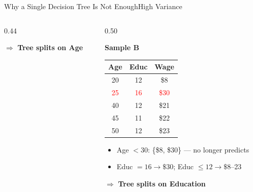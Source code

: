 \documentclass[dvipsnames,hyperref={pdfpagelabels=false}]{beamer}
\begin{document}
\begin{frame}{Why a Single Decision Tree Is Not Enough}{High Variance}
\begin{columns}[T]
\begin{column}{0.44\textwidth}
\begin{itemize}
  \end{itemize}
      \vspace{0.1cm}
  $\Rightarrow$ \textbf{Tree splits on Age}
\end{column}
\hfill
\begin{column}{0.50\textwidth}
  \begin{center}\textbf{Sample B}\end{center}
  \begin{center}\small
  \begin{tabular}{@{}ccc@{}}
    \toprule
    Age & Educ & Wage \\
    \midrule
    20                   & 12                   & \$8                  \\
    \textcolor{red}{25}  & \textcolor{red}{16}  & \textcolor{red}{\$30}\\
    40                   & 12                   & \$21                 \\
    45                   & 11                   & \$22                 \\
    50                   & 12                   & \$23                 \\
    \bottomrule
  \end{tabular}
  \end{center}
  \begin{itemize}\small
    \item Age $<30$: \{\$8, \$30\} --- no longer predicts
      \vspace{0.1cm}
    \item Educ $=16\to\$30$; Educ $\leq12\to\$8$--23
  \end{itemize}
  \vspace{0.1cm}
  $\Rightarrow$ \textbf{Tree splits on Education}
\end{column}
\end{columns}
\end{frame}
\end{document}
